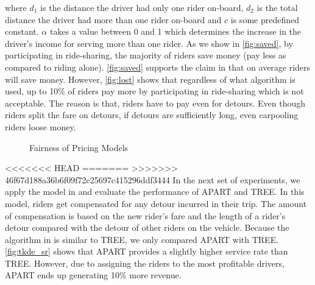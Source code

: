 \noindent where $d_1$ is the distance the driver had only one rider on-board, $d_2$ is the total distance the driver had more than one rider on-board and $c$ is some predefined constant. $\alpha$ takes a value between 0 and 1 which determines the increase in the driver's income for serving more than one rider. As we show in \cref{fig:saved}, by participating in ride-sharing, the majority of riders save money (pay less as compared to riding alone). \cref{fig:saved} supports the claim in \cite{Ma13} that on average riders will save money. However, \cref{fig:lost} shows that regardless of what algorithm is used, up to 10\% of riders pay more by participating in ride-sharing which is not acceptable. The reason is that, riders have to pay even for detours. Even though riders split the fare on detours, if detours are sufficiently long, even carpooling riders loose money.

\begin{figure}[h!]
	\centering
    \vspace{-0.15in}
    \caption{Fairness of Pricing Models}
    \label{fig:fairness}
\end{figure}

<<<<<<< HEAD
\vspace{-3mm}
=======
>>>>>>> 46f67d188a36b6f09f72c25697c415296ddf3444
In the next set of experiments, we apply the model in \cite{Ma15} and evaluate the performance of APART and TREE. In this model, riders get compensated for any detour incurred in their trip. The amount of compensation is based on the new rider's fare and the length of a rider's detour compared with the detour of other riders on the vehicle. Because the algorithm in \cite{Ma15} is similar to TREE, we only compared APART with TREE. \cref{fig:tkde_sr} shows that APART provides a slightly higher service rate than TREE. However, due to assigning the riders to the most profitable drivers, APART ends up generating 10\% more revenue.

